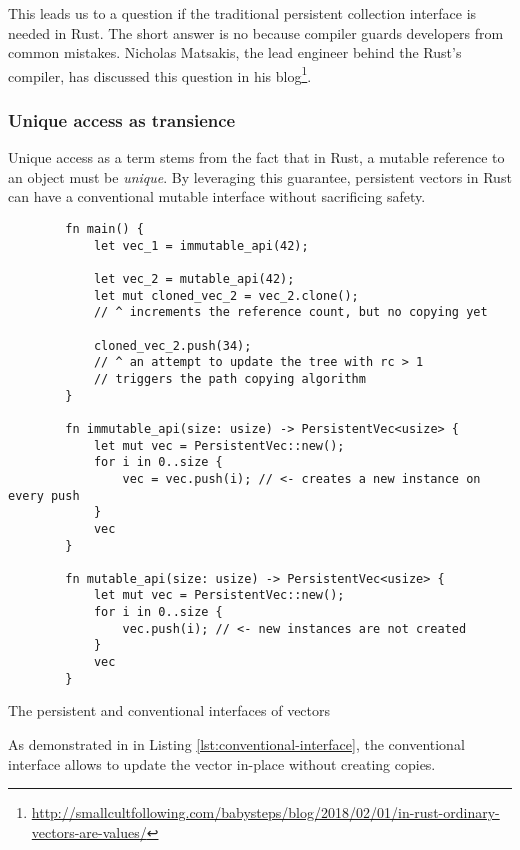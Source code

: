 This leads us to a question if the traditional persistent collection interface is needed in Rust. The short answer is no because compiler guards developers from common mistakes. Nicholas Matsakis, the lead engineer behind the Rust's compiler, has discussed this question in his blog\footnote{\url{http://smallcultfollowing.com/babysteps/blog/2018/02/01/in-rust-ordinary-vectors-are-values/}}.

\subsubsection*{Unique access as transience}
Unique access as a term stems from the fact that in Rust, a mutable reference to an object must be \emph{unique}. By leveraging this guarantee, persistent vectors in Rust can have a conventional mutable interface without sacrificing safety.

\begin{listing}[!ht]

    \centering
    \begin{verbatim}
        fn main() {
            let vec_1 = immutable_api(42);

            let vec_2 = mutable_api(42);
            let mut cloned_vec_2 = vec_2.clone();
            // ^ increments the reference count, but no copying yet

            cloned_vec_2.push(34);
            // ^ an attempt to update the tree with rc > 1
            // triggers the path copying algorithm
        }

        fn immutable_api(size: usize) -> PersistentVec<usize> {
            let mut vec = PersistentVec::new();
            for i in 0..size {
                vec = vec.push(i); // <- creates a new instance on every push
            }
            vec
        }

        fn mutable_api(size: usize) -> PersistentVec<usize> {
            let mut vec = PersistentVec::new();
            for i in 0..size {
                vec.push(i); // <- new instances are not created
            }
            vec
        }
    \end{verbatim}

    \caption{The persistent and conventional interfaces of vectors}
    \label{lst:conventional-interface}
\end{listing}

As demonstrated in  in Listing \ref{lst:conventional-interface}, the conventional interface allows to update the vector in-place without creating copies.

